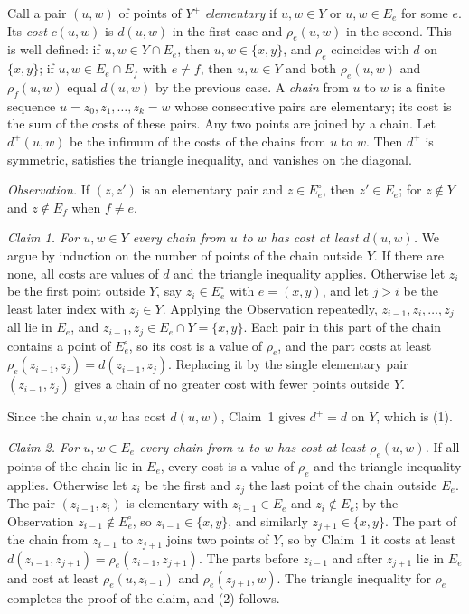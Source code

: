 \documentclass[11pt]{amsart}
\theoremstyle{definition}
\theoremstyle{remark}
\numberwithin{equation}{section}
\begin{document}
Call a pair $(u,w)$ of points of $Y^+$ \emph{elementary} if $u,w\in Y$ or $u,w\in E_e$ for some $e$. Its \emph{cost} $c(u,w)$ is $d(u,w)$ in the first case and $\rho_e(u,w)$ in the second. This is well defined: if $u,w\in Y\cap E_e$, then $u,w\in\{x,y\}$, and $\rho_e$ coincides with $d$ on $\{x,y\}$; if $u,w\in E_e\cap E_f$ with $e\ne f$, then $u,w\in Y$ and both $\rho_e(u,w)$ and $\rho_f(u,w)$ equal $d(u,w)$ by the previous case. A \emph{chain} from $u$ to $w$ is a finite sequence $u=z_0,z_1,\dots,z_k=w$ whose consecutive pairs are elementary; its cost is the sum of the costs of these pairs. Any two points are joined by a chain. Let $d^+(u,w)$ be the infimum of the costs of the chains from $u$ to $w$. Then $d^+$ is symmetric, satisfies the triangle inequality, and vanishes on the diagonal.

\smallskip\noindent\emph{Observation.} If $(z,z')$ is an elementary pair and $z\in E_e^\circ$, then $z'\in E_e$; for $z\notin Y$ and $z\notin E_f$ when $f\neq e$.

\smallskip\noindent\emph{Claim 1. For $u,w\in Y$ every chain from $u$ to $w$ has cost at least $d(u,w)$.} We argue by induction on the number of points of the chain outside $Y$. If there are none, all costs are values of $d$ and the triangle inequality applies. Otherwise let $z_i$ be the first point outside $Y$, say $z_i\in E_e^\circ$ with $e=(x,y)$, and let $j>i$ be the least later index with $z_j\in Y$. Applying the Observation repeatedly, $z_{i-1},z_i,\dots,z_j$ all lie in $E_e$, and $z_{i-1},z_j\in E_e\cap Y=\{x,y\}$. Each pair in this part of the chain contains a point of $E_e^\circ$, so its cost is a value of $\rho_e$, and the part costs at least $\rho_e(z_{i-1},z_j)=d(z_{i-1},z_j)$. Replacing it by the single elementary pair $(z_{i-1},z_j)$ gives a chain of no greater cost with fewer points outside $Y$.

Since the chain $u,w$ has cost $d(u,w)$, Claim~1 gives $d^+=d$ on $Y$, which is (1).

\smallskip\noindent\emph{Claim 2. For $u,w\in E_e$ every chain from $u$ to $w$ has cost at least $\rho_e(u,w)$.} If all points of the chain lie in $E_e$, every cost is a value of $\rho_e$ and the triangle inequality applies. Otherwise let $z_i$ be the first and $z_j$ the last point of the chain outside $E_e$. The pair $(z_{i-1},z_i)$ is elementary with $z_{i-1}\in E_e$ and $z_i\notin E_e$; by the Observation $z_{i-1}\notin E_e^\circ$, so $z_{i-1}\in\{x,y\}$, and similarly $z_{j+1}\in\{x,y\}$. The part of the chain from $z_{i-1}$ to $z_{j+1}$ joins two points of $Y$, so by Claim~1 it costs at least $d(z_{i-1},z_{j+1})=\rho_e(z_{i-1},z_{j+1})$. The parts before $z_{i-1}$ and after $z_{j+1}$ lie in $E_e$ and cost at least $\rho_e(u,z_{i-1})$ and $\rho_e(z_{j+1},w)$. The triangle inequality for $\rho_e$ completes the proof of the claim, and (2) follows.
\end{document}
